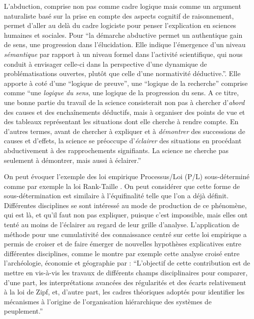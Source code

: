 L'abduction, comprise non pas comme cadre logique mais comme un argument naturaliste basé sur la prise en compte des aspects cognitif de raisonnement, permet d'aller au delà du cadre logiciste pour penser l'explication en sciences humaines et sociales. Pour \textcite{Besse2000} \enquote{la démarche abductive permet un authentique gain de sens, une progression dans l'élucidation. Elle indique l'émergence d'un niveau \textit{sémantique} par rapport à un niveau formel dans l'activité scientifique, qui nous conduit à envisager celle-ci dans la perspective d'une dynamique de problématisations ouvertes, plutôt que celle d'une normativité déductive.}. Elle apporte à coté d'une \enquote{logique de preuve}, une \enquote{logique de la recherche} comprise comme \enquote{une \textit{logique du sens}, une logique de la progression du sens. A ce titre, une bonne partie du travail de la science consisterait non pas à chercher d'\textit{abord} des causes et des enchaînements déductifs, mais à organiser des points de vue et des tableaux représentant les situations dont elle cherche à rendre compte. En d'autres termes, avant de chercher à expliquer et à \textit{démontrer} des successions de causes et d'effets, la science se préoccupe d'\textit{éclairer} des situations en procédant abductivement à des rapprochements signifiants. La science ne cherche pas seulement à démontrer, mais aussi à éclairer.} 

On peut évoquer l'exemple des loi empirique Processus/Loi (P/L) sous-déterminé  comme par exemple la loi Rank-Taille \autocite{Varenne2014}. On peut considérer que cette forme de sous-détermination est similaire à l'équifinalité telle que l'on a déjà définit. Différentes disciplines se sont intéressé au mode de production de ce phénomène, qui est là, et qu'il faut non pas expliquer, puisque c'est impossible, mais elles ont tenté au moins de l'éclairer au regard de leur grille d'analyse. L'application de méthode pour une cumulativité des connaissance centré sur cette loi empirique a permis de croiser et de faire émerger de nouvelles hypothèses explicatives entre différentes disciplines, comme le montre par exemple cette analyse croisé entre l'archéologie, économie et  géographie par \textcite{Sanders2012} : \enquote{L’objectif de cette contribution est de mettre en vis-à-vis les travaux de différents champs disciplinaires pour comparer, d’une part, les interprétations avancées des régularités et des écarts relativement à la loi de Zipf, et, d’autre part, les cadres théoriques adoptés pour identifier les mécanismes à l’origine de l’organisation hiérarchique des systèmes de peuplement.}

